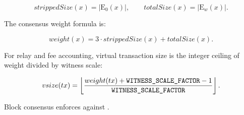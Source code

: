 \[
  strippedSize(x) = |\mathrm{E}_{0}(x)|,
  \qquad
  totalSize(x) = |\mathrm{E}_{w}(x)|.
\]

The consensus weight formula is:

\[
  weight(x) = 3 \cdot strippedSize(x) + totalSize(x).
\]

For relay and fee accounting, virtual transaction size is the integer ceiling
of weight divided by witness scale:

\[
  vsize(tx) =
  \left\lfloor
  \frac{weight(tx) + \text{\texttt{WITNESS\_SCALE\_FACTOR}} - 1}
       {\text{\texttt{WITNESS\_SCALE\_FACTOR}}}
  \right\rfloor.
\]

Block consensus enforces  against 
\cite{bip-0141,bitcoin-core-v31}.
